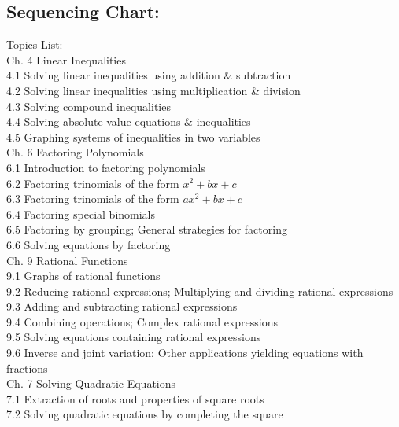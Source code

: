 \documentclass{ximera}
\begin{document}
\subsection*{Sequencing Chart:}
Topics List:\\
Ch. 4 Linear Inequalities\\
4.1 Solving linear inequalities using addition \& subtraction\\
4.2 Solving linear inequalities using multiplication \& division\\
4.3 Solving compound inequalities\\
4.4 Solving absolute value equations \& inequalities\\
4.5 Graphing systems of inequalities in two variables\\
Ch. 6 Factoring Polynomials\\
6.1 Introduction to factoring polynomials\\
6.2 Factoring trinomials of the form $x^{2}+b x+c$\\
6.3 Factoring trinomials of the form $a x^{2}+b x+c$\\
6.4 Factoring special binomials\\
6.5 Factoring by grouping; General strategies for factoring\\
6.6 Solving equations by factoring\\
Ch. 9 Rational Functions\\
9.1 Graphs of rational functions\\
9.2 Reducing rational expressions; Multiplying and dividing rational expressions\\
9.3 Adding and subtracting rational expressions\\
9.4 Combining operations; Complex rational expressions\\
9.5 Solving equations containing rational expressions\\
9.6 Inverse and joint variation; Other applications yielding equations with fractions\\
Ch. 7 Solving Quadratic Equations\\
7.1 Extraction of roots and properties of square roots\\
7.2 Solving quadratic equations by completing the square\\
\end{document}
